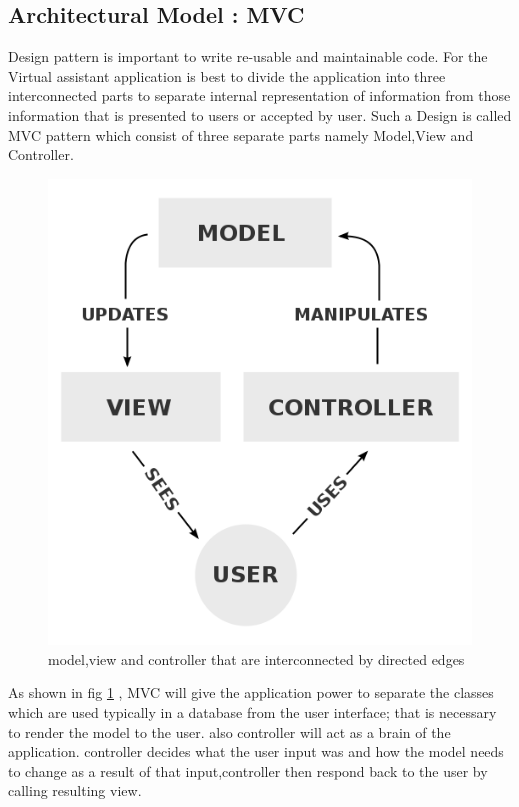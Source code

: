\subsection{Architectural Model : MVC}
Design pattern is important to write re-usable and maintainable code. For the Virtual assistant application is best to divide the application  into three interconnected parts to separate internal representation of information from those information that is presented to users or accepted by user\cite{wiki:mvc}. Such a Design is called MVC pattern which consist of three separate parts namely Model,View and Controller.
\begin{figure}[h]
\centering
\includegraphics[scale=0.3]{./img/MVC.PNG}
\caption{\small{model,view and controller that are interconnected by directed edges}}
\label{mvc}
	
\end{figure}

As shown in fig \ref{mvc} , MVC will give the application power to separate the classes which are used typically in a database from the user interface; that is necessary to render the model to the user. also controller will act as a brain of the application. controller decides what the user input was and how the model needs to change as a result of that input\cite{codinghorror},controller then respond back to the user by calling resulting view.

